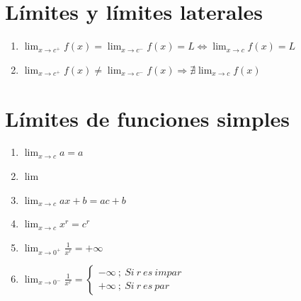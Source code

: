 \documentclass[12pt,a4paper]{article}
\begin{document}
    \section{\textcolor{violeta}{Límites y límites laterales}}
    \begin{tcolorbox}[colback=white!5!white,colframe=violeta!75!black]
        \begin{enumerate}
        \centering
        \item $\displaystyle\lim_{x \to {c^+}}{f(x)}=\displaystyle\lim_{x \to {c^-}}{f(x)}=L\Leftrightarrow \displaystyle\lim_{x \to c}{f(x)}=L $
        \item $\displaystyle\lim_{x \to {c^+}}{f(x)}\neq \displaystyle\lim_{x \to {c^-}}{f(x)} \Rightarrow  \nexists\lim_{x \to c}{f(x)}  $
        \end{enumerate}
    \end{tcolorbox}

    \section{\textcolor{violeta}{Límites de funciones simples}}
    \begin{tcolorbox}[colback=white!5!white,colframe=violeta!75!black]
        \begin{multicols}{2}
            \begin{enumerate}
                \item $\displaystyle\lim_{x \to c}{a}=a $
                \item $\displaystyle\lim_{}{} $
                \item $\displaystyle\lim_{x \to c}{ax+b}=ac+b $
                \item $\displaystyle\lim_{x \to c}{x^r}=c^r $ 
                \item $\displaystyle\lim_{x \to {0^+}}{\frac{1}{x^r}}=+\infty $
                \item $\displaystyle\lim_{x \to {0^-}}{\frac{1}{x^r}}=\left\lbrace \begin{array}{c} -\infty\:;\:Si\:r\:es\:impar\\+\infty\:;\:Si\:r\:es\:par \end {array} \right. $ 
            \end{enumerate}
        \end{multicols}
    \end{tcolorbox}
\end{document}
